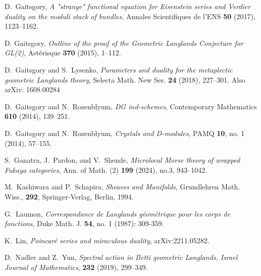 \documentclass[9pt]{amsart}
\theoremstyle{remark}
\theoremstyle{definition}
\theoremstyle{remark}
\numberwithin{equation}{section}
\begin{document}
\begin{thebibliography}{99}

%


 D.~Gaitsgory, {\it A "strange" functional equation for Eisenstein series and Verdier
duality on the moduli stack of bundles}, Annales Scientifiques de l'ENS {\bf 50} (2017), 1123--1162. 

 D. Gaitsgory, {\it Outline of the proof of the Geometric Langlands Conjecture for GL(2)}, Ast\'erisque {\bf 370} (2015),
1--112.

%
 D.~Gaitsgory and S.~Lysenko, {\it Parameters and duality for the metaplectic geometric Langlands theory}, 
Selecta Math. New Ser. {\bf 24} (2018), 227--301. Also arXiv: 1608.00284

  D.~Gaitsgory and N.~Rozenblyum, {\it DG ind-schemes}, Contemporary Mathematics {\bf 610} (2014), 139--251. 

  D.~Gaitsgory and N.~Rozenblyum, {\it Crystals and D-modules}, PAMQ {\bf 10}, no. 1 (2014), 57--155.

 S.~Ganatra, J.~Pardon, and V.~Shende,
{\it Microlocal Morse theory of wrapped Fukaya categories},
Ann. of Math. (2) {\bf 199} (2024), no.3, 943–1042.

 M.~Kashiwara and P.~Schapira, {\it Sheaves and Manifolds},
Grundlehren Math. Wiss., {\bf 292},
Springer-Verlag, Berlin, 1994. 

 G.~Laumon, {\it Correspondance de Langlands géométrique pour les corps de fonctions}, Duke Math. J. {\bf 54}, no. 1 (1987): 309-359.

 K.~Lin, {\it Poincar\'e series and miraculous duality}, arXiv:2211.05282.

 D.~Nadler and Z.~Yun, {\it Spectral action in Betti geometric Langlands, Israel Journal of Mathematics}, {\bf 232} (2019), 
299--349.



\end{thebibliography}
\end{document}
